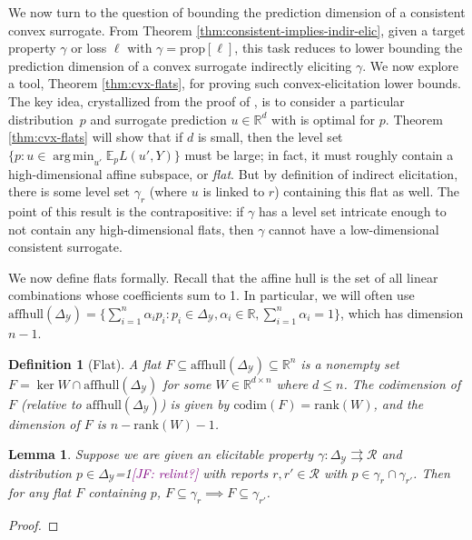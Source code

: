 \documentclass{article}
\newcommand{\Comments}{1}
\newcommand{\mynote}[2]{\ifnum\Comments=1\textcolor{#1}{#2}\fi}
\newcommand{\jessie}[1]{\mynote{purple}{[JF: #1]}}
\newcommand{\reals}{\mathbb{R}}
\newcommand{\simplex}{\Delta_\Y}
\newcommand{\prop}[1]{\mathrm{prop}[#1]}
\newcommand{\codim}{\mathrm{codim}}
\newcommand{\affhull}{\mathrm{affhull}}
\newcommand{\E}{\mathbb{E}}
\newcommand{\R}{\mathcal{R}}
\newcommand{\Y}{\mathcal{Y}}
\newcommand{\exploss}[3]{\E_{#3} #1(#2,Y)}
\newcommand{\toto}{\rightrightarrows}
\newtheorem{lemma}{Lemma}
\newtheorem{definition}{Definition}
\DeclareMathOperator*{\argmin}{arg\,min}
\begin{document}
We now turn to the question of bounding the prediction dimension of a consistent convex surrogate.
From Theorem \ref{thm:consistent-implies-indir-elic}, given a target property $\gamma$ or loss $\ell$ with $\gamma = \prop{\ell}$, this task reduces to lower bounding the prediction dimension of a convex surrogate indirectly eliciting $\gamma$.
We now explore a tool, Theorem \ref{thm:cvx-flats}, for proving such convex-elicitation lower bounds.
The key idea, crystallized from the proof of \citet[Theorem 16]{ramaswamy2016convex}, is to consider a particular distribution~$p$ and surrogate prediction $u \in \reals^d$ with is optimal for $p$.
Theorem \ref{thm:cvx-flats} will show that if $d$ is small, then the level set $\{p : u \in \argmin_{u'} \exploss{L}{u'}{p}\}$ must be large; in fact, it must roughly contain a high-dimensional affine subspace, or \emph{flat}.
But by definition of indirect elicitation, there is some level set $\gamma_r$ (where $u$ is linked to $r$) containing this flat as well.
The point of this result is the contrapositive: if $\gamma$ has a level set intricate enough to not contain any high-dimensional flats, then $\gamma$ cannot have a low-dimensional consistent surrogate.

We now define flats formally.
Recall that the affine hull is the set of all linear combinations whose coefficients sum to 1.
In particular, we will often use $\affhull(\simplex) = \{\sum_{i=1}^n \alpha_i p_i : p_i \in \simplex, \alpha_i \in \reals, \sum_{i=1}^n \alpha_i = 1\}$, which has dimension $n-1$.
\begin{definition}[Flat]
	A \emph{flat} $F \subseteq \affhull(\simplex) \subseteq \reals^n$ is a nonempty set $F = \ker W \cap \affhull(\simplex)$ for some $W\in\reals^{d\times n}$ where $d\leq n$.
	The codimension of $F$ (relative to $\affhull(\simplex)$) is given by $\codim(F)=\mathrm{rank}(W)$, and the dimension of $F$ is $n - \mathrm{rank}(W) - 1$.
\end{definition}

\begin{lemma}\label{lem:set-valued-prop-flats}
	Suppose we are given an elicitable property $\gamma : \simplex \toto \R$ and distribution $p \in \simplex$\jessie{relint?} with reports $r,r' \in \R$ with $p \in \gamma_r \cap \gamma_{r'}$.
	Then for any flat $F$ containing $p$, $F \subseteq \gamma_r \implies F \subseteq \gamma_{r'}$.
\end{lemma}
\begin{proof}
	
\end{proof}
\end{document}
